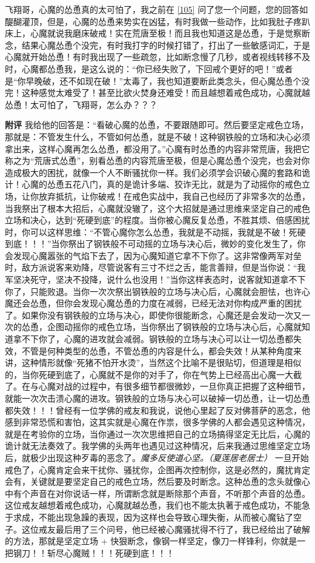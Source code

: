\begin{case}
    飞翔哥，心魔的怂恿真的太可怕了，我之前在 \ref{105} 问了您一个问题，您的回答如醍醐灌顶，但是，心魔的怂恿来势实在凶猛，有时我做一些动作，比如我肚子疼趴床上，心魔就说我磨床破戒！实在荒唐至极！而且我也知道这是怂恿，于是觉察断念，结果心魔怂恿个没完，有时我打字的时候打错了，打出了一些敏感词汇，于是心魔就开始怂恿！有时我出现了一些疏忽，比如断念慢了几秒，或者视线转移不及时，心魔都怂恿我，是这么说的：“你已经失败了，下回戒个更好的吧！”或者是“你早晚破，还不如现在破！”太毒了，我也知道要断此类念头，但心魔怂恿个没完！这种感觉太难受了！甚至比欲火焚身还难受！而且越想着戒色成功，心魔就越怂恿！太可怕了，飞翔哥，怎么办？？？

    \textbf{附评} 我给他的回答是：“看破心魔的怂恿，不要跟随即可。然后要坚定戒色立场，那就是：不管发生什么，不管如何怂恿，就是不破！这种钢铁般的立场和决心必须拿出来，这样心魔再怎么怂恿，都没用了。”心魔有时怂恿的内容非常荒唐，我把它称之为“荒唐式怂恿”，别看怂恿的内容荒唐至极，但是心魔怂恿个没完，也会对你造成极大的困扰，就像一个人不断骚扰你一样。我们必须学会识破心魔的套路和诡计！心魔的怂恿五花八门，真的是诡计多端、狡诈无比，就是为了动摇你的戒色立场，让你放弃抵抗，让你破戒！在戒色实战中，我自己也经历了非常多次的怂恿，当我祭出了根本大招后，心魔就没辙了，这个大招就是通过思维来坚定自己的戒色立场和决心，达到“死硬到底”的程度。当你被心魔反复怂恿，不胜其烦、倍感困扰时，你可以这样思维：“不管心魔你怎么怂恿，我就是不动摇，我就是不破！死硬到底！！！”当你祭出了钢铁般不可动摇的立场与决心后，微妙的变化发生了，你会发现心魔嚣张的气焰下去了，因为心魔知道它拿不下你了。这非常像两军对垒时，敌方派说客来劝降，尽管说客有三寸不烂之舌，能言善辩，但是当你说：“我军坚决死守，坚决不投降，说什么也没用！”当你这样表态时，说客就知道拿不下你了，只能败退。当你一次次祭出钢铁般的立场与决心后，心魔就会胆怯，也许心魔还会怂恿，但你会发现心魔怂恿的力度在减弱，已经无法对你构成严重的困扰了。如果你没有钢铁般的立场与决心，即使你很能断念，心魔还是会发动一次又一次的怂恿，企图动摇你的戒色立场，当你祭出了钢铁般的立场与决心后，心魔就知道拿不下你了，心魔的进攻就会减弱。钢铁般的立场与决心可以让一切怂恿都失效，不管是何种类型的怂恿，不管怂恿的内容是什么，都会失效！从某种角度来讲，这种情形就像“死猪不怕开水烫”，当然这个比喻不是很贴切，但道理是相似的，当你死硬到底了，心魔就不是你的对手了，你在气势上已经高出心魔一大截了。在与心魔对战的过程中，有很多细节都很微妙，一旦你真正把握了这种细节，就能一次次击溃心魔的进攻。钢铁般的立场与决心可以破掉一切怂恿，让一切怂恿都失效！！！曾经有一位学佛的戒友和我说，说他心里起了反对佛菩萨的恶念，他感到非常恐慌和害怕，这其实就是心魔在作祟，很多学佛的人都会遇见这种情况，就是在考验你的立场，当你通过一次次思维把自己的立场搞得坚定无比后，心魔的诡计就无法奏效了。我学佛的头两年也遇见过这种情况，后来我通过思维坚定立场后，就极少出现这种歹毒的恶念了。\textit{魔多反使道心坚。（夏莲居老居士）} 一旦开始戒色了，心魔肯定会来干扰你、骚扰你，企图再次控制你，这是必然的，魔扰肯定会有，关键就是要坚定自己的戒色立场，然后要及时断念。这种怂恿的念头就像心中有个声音在对你说话一样，所谓断念就是断除那个声音，不听那个声音的怂恿。这位戒友越想着戒色成功，心魔就越怂恿，我们也不能太执著于戒色成功，不能急于求成，不能出现急躁的表现，因为这样也会导致心理失衡，从而被心魔钻了空子。这位戒友最后用了三个问号，他已经被心魔骚扰得不行了，我已经给出了破解的方法，那就是坚定立场 + 快狠断念，像钢一样坚定，像刀一样锋利，你就是一把钢刀！！斩尽心魔贼！！！死硬到底！！！

\end{case}
